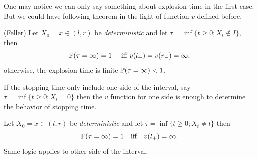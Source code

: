 One may notice we can only say something about explosion time in the first case. But we could have following theorem in the light of function $v$ defined before.
\begin{thm}{(Feller)}  Let $X_0 = x \in (l ,r)$ be \textit{deterministic} and let $\tau = \inf\{t\geq 0; X_t \notin I\}$, then 
\begin{equation*}
    \mathbb{P}(\tau = \infty) = 1 \quad \text{ iff } v(l_+) = v(r_-) = \infty,
\end{equation*} otherwise, the explosion time is finite $\mathbb{P}(\tau = \infty) < 1$.
\end{thm}

If the stopping time only include one side of the interval, say $\tau = \inf\{t \geq 0; X_t = 0\}$ then the $v$ function for one side is enough to determine the behavior of stopping time.
\begin{cor}
Let $X_0 = x \in (l ,r)$ be \textit{deterministic} and let $\tau = \inf\{t\geq 0; X_t \neq l\}$ then 
\begin{equation*}
    \mathbb{P}(\tau = \infty) = 1 \quad \text{iff} \quad v(l_+) = \infty.
\end{equation*}
Same logic applies to other side of the interval.
\end{cor}

